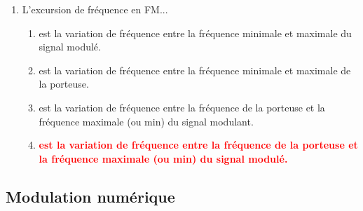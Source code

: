 \documentclass[a4paper]{article}
\begin{document}
\begin{enumerate}[label=Q\arabic*.]
\item L’excursion de fréquence en FM...
\begin{enumerate}
    \item est la variation de fréquence entre la fréquence minimale et maximale du signal modulé.
    \item est la variation de fréquence entre la fréquence minimale et maximale de la porteuse.
    \item est la variation de fréquence entre la fréquence de la porteuse et la fréquence maximale (ou min) du signal modulant.
    \item \textcolor{red}{\textbf{est la variation de fréquence entre la fréquence de la porteuse et la fréquence maximale (ou min) du signal modulé.}}
\end{enumerate}


\end{enumerate}










\subsection{Modulation numérique}
\end{document}
